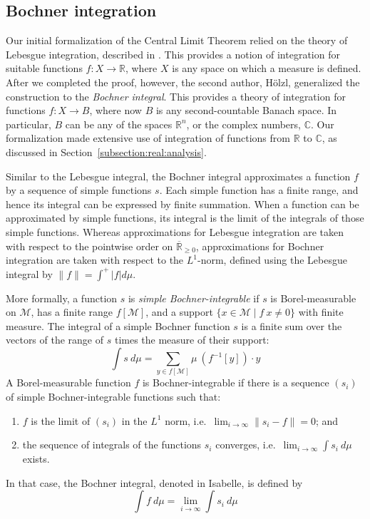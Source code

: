 \documentclass{svjour3}
\newcommand{\RR}{\mathbb{R}}
\newcommand{\CC}{\mathbb{C}}
\newcommand{\ennRR}{\overline{\mathbb{R}}_{\ge 0}}
\newcommand{\mdl}[1]{{\mathcal #1}} %
\begin{document}
\subsection{Bochner integration}
\label{subsection:bochner}

Our initial formalization of the Central Limit Theorem relied on the theory of Lebesgue integration, described in \cite{hoelzl:heller:11}. This provides a notion of integration for suitable functions $f : X \to \RR$, where $X$ is any space on which a measure is defined. After we completed the proof, however, the second author, H\"olzl, generalized the construction to the \emph{Bochner integral}. This provides a theory of integration for functions $f : X \to B$, where now $B$ is any second-countable Banach space. In particular, $B$ can be any of the spaces $\RR^n$, or the complex numbers, $\CC$. Our formalization made extensive use of integration of functions from $\RR$ to $\CC$, as discussed in Section~\ref{subsection:real:analysis}.

Similar to the Lebesgue integral, the Bochner integral approximates a function $f$ by a sequence of simple functions $s$. Each simple function has a finite range, and hence its integral can be expressed by finite summation. When a function can be approximated by simple functions, its  integral is the limit of the integrals of those simple functions. Whereas approximations for Lebesgue integration are taken with respect to the pointwise order on $\ennRR$, approximations for Bochner integration are taken with respect to the $L^1$-norm, defined using the Lebesgue integral by $\lVert f \rVert = \int^+ |f| d\mu$.

More formally, a function $s$ is \emph{simple Bochner-integrable} if $s$ is Borel-measurable on $\mdl M$, has a finite range $f[\mdl M]$, and a support $\{x \in \mdl M \mid f~x \not= 0\}$ with finite measure. The integral of a simple Bochner function $s$ is a finite sum over the vectors of the range of $s$ times the measure of their support:
\[ \int s~d\mu = \sum_{ y \in f[\mdl M]} \mu~(f^{-1}[y]) \cdot y\]
A Borel-measurable function $f$ is Bochner-integrable if there is a sequence $(s_i)$ of simple Bochner-integrable functions such that:
\begin{enumerate}
 \item $f$ is the limit of $(s_i)$ in the $L^1$ norm, i.e.~$\lim_{i \rightarrow \infty} \lVert s_i - f \rVert = 0$; and
 \item the sequence of integrals of the functions $s_i$ converges, i.e.~$\lim_{i \rightarrow \infty} \int s_i ~d\mu$ exists.
\end{enumerate}
In that case, the Bochner integral, denoted  in Isabelle, is defined by
\[ \int f~d\mu = \lim_{i \rightarrow \infty} \int s_i ~d\mu \]
\end{document}
